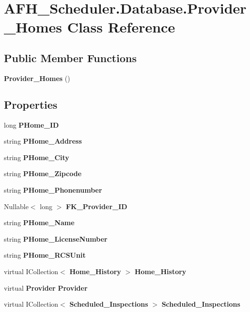 \section{A\+F\+H\+\_\+\+Scheduler.\+Database.\+Provider\+\_\+\+Homes Class Reference}
\label{class_a_f_h___scheduler_1_1_database_1_1_provider___homes}
\subsection*{Public Member Functions}
\begin{DoxyCompactItemize}
\item 
\textbf{ Provider\+\_\+\+Homes} ()
\end{DoxyCompactItemize}
\subsection*{Properties}
\begin{DoxyCompactItemize}
\item 
long \textbf{ P\+Home\+\_\+\+ID}\hspace{0.3cm}{\ttfamily  [get, set]}
\item 
string \textbf{ P\+Home\+\_\+\+Address}\hspace{0.3cm}{\ttfamily  [get, set]}
\item 
string \textbf{ P\+Home\+\_\+\+City}\hspace{0.3cm}{\ttfamily  [get, set]}
\item 
string \textbf{ P\+Home\+\_\+\+Zipcode}\hspace{0.3cm}{\ttfamily  [get, set]}
\item 
string \textbf{ P\+Home\+\_\+\+Phonenumber}\hspace{0.3cm}{\ttfamily  [get, set]}
\item 
Nullable$<$ long $>$ \textbf{ F\+K\+\_\+\+Provider\+\_\+\+ID}\hspace{0.3cm}{\ttfamily  [get, set]}
\item 
string \textbf{ P\+Home\+\_\+\+Name}\hspace{0.3cm}{\ttfamily  [get, set]}
\item 
string \textbf{ P\+Home\+\_\+\+License\+Number}\hspace{0.3cm}{\ttfamily  [get, set]}
\item 
string \textbf{ P\+Home\+\_\+\+R\+C\+S\+Unit}\hspace{0.3cm}{\ttfamily  [get, set]}
\item 
virtual I\+Collection$<$ \textbf{ Home\+\_\+\+History} $>$ \textbf{ Home\+\_\+\+History}\hspace{0.3cm}{\ttfamily  [get, set]}
\item 
virtual \textbf{ Provider} \textbf{ Provider}\hspace{0.3cm}{\ttfamily  [get, set]}
\item 
virtual I\+Collection$<$ \textbf{ Scheduled\+\_\+\+Inspections} $>$ \textbf{ Scheduled\+\_\+\+Inspections}\hspace{0.3cm}{\ttfamily  [get, set]}
\end{DoxyCompactItemize}


